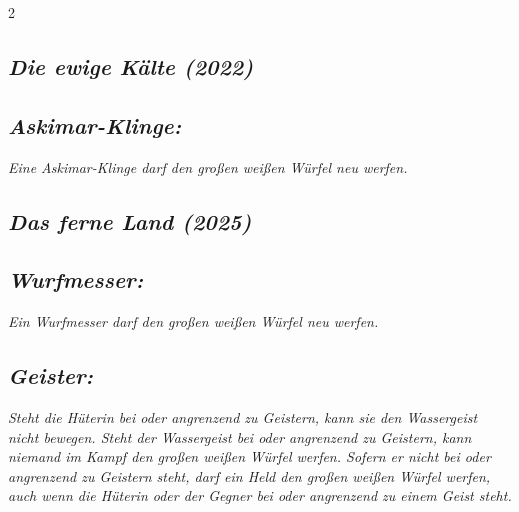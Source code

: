\documentclass[10pt, a4paper, oneside]{book}
\newcommand{\fan}[1]{\textit{#1}}
\begin{document}
\begin{multicols*}{2}
\begin{bgcolor}[color-DZ]
\end{bgcolor}






\begin{bgcolor}
\section{\fan{Die ewige Kälte (2022)}}

\subsection{\fan{Askimar-Klinge:}}

\fan{Eine Askimar-Klinge darf den großen weißen Würfel neu werfen.}

\end{bgcolor}






\begin{bgcolor}
\section{\fan{Das ferne Land (2025)}}

\subsection{\fan{Wurfmesser:}}

\fan{Ein Wurfmesser darf den großen weißen Würfel neu werfen.}


\subsection{\fan{Geister:}}

\fan{Steht die Hüterin bei oder angrenzend zu Geistern, kann sie den Wassergeist nicht bewegen. Steht der Wassergeist bei oder angrenzend zu Geistern, kann niemand im Kampf den großen weißen Würfel werfen. Sofern er nicht bei oder angrenzend zu Geistern steht, darf ein Held den großen weißen Würfel werfen, auch wenn die Hüterin oder der Gegner bei oder angrenzend zu einem Geist steht.}

\end{bgcolor}








\end{multicols*}
\end{document}
